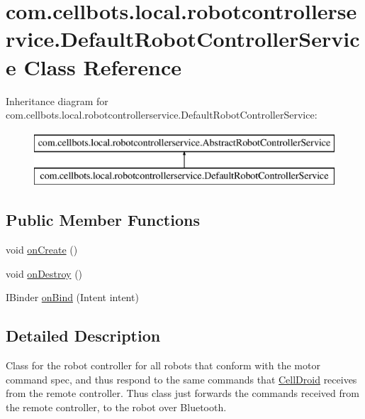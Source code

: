 \hypertarget{classcom_1_1cellbots_1_1local_1_1robotcontrollerservice_1_1_default_robot_controller_service}{\section{com.\-cellbots.\-local.\-robotcontrollerservice.\-Default\-Robot\-Controller\-Service Class Reference}
\label{classcom_1_1cellbots_1_1local_1_1robotcontrollerservice_1_1_default_robot_controller_service}
}
Inheritance diagram for com.\-cellbots.\-local.\-robotcontrollerservice.\-Default\-Robot\-Controller\-Service\-:\begin{figure}[H]
\begin{center}
\leavevmode
\includegraphics[height=2.000000cm]{classcom_1_1cellbots_1_1local_1_1robotcontrollerservice_1_1_default_robot_controller_service}
\end{center}
\end{figure}
\subsection*{Public Member Functions}
\begin{DoxyCompactItemize}
\item 
void \hyperlink{classcom_1_1cellbots_1_1local_1_1robotcontrollerservice_1_1_default_robot_controller_service_a36ee82d2960d2af2efdc7fec93380400}{on\-Create} ()
\item 
void \hyperlink{classcom_1_1cellbots_1_1local_1_1robotcontrollerservice_1_1_default_robot_controller_service_ab0251d8f57767319ab32321dfe20f070}{on\-Destroy} ()
\item 
I\-Binder \hyperlink{classcom_1_1cellbots_1_1local_1_1robotcontrollerservice_1_1_default_robot_controller_service_af7d407e3aceaa0f5097020bb91af87a6}{on\-Bind} (Intent intent)
\end{DoxyCompactItemize}


\subsection{Detailed Description}
Class for the robot controller for all robots that conform with the motor command spec, and thus respond to the same commands that \hyperlink{classcom_1_1cellbots_1_1local_1_1_cell_droid}{Cell\-Droid} receives from the remote controller. Thus class just forwards the commands received from the remote controller, to the robot over Bluetooth.

